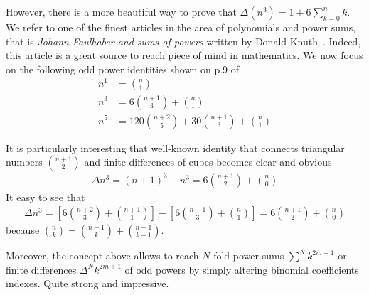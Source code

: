 However, there is a more beautiful way to prove that $\Delta(n^3) = 1 + 6 \sum_{k=0}^{n} k$.
We refer to one of the finest articles in the area of polynomials and power sums,
that is \textit{Johann Faulhaber and sums of powers} written by Donald Knuth~\cite{knuth1993johann}.
Indeed, this article is a great source to reach piece of mind in mathematics.
We now focus on the following odd power identities shown on p.9 of~\cite{knuth1993johann}
\begin{align*}
    n^1 &= \binom{n}{1} \\
    n^3 &= 6 \binom{n+1}{3} + \binom{n}{1} \\
    n^5 &= 120 \binom{n+2}{5} + 30 \binom{n+1}{3} + \binom{n}{1}
\end{align*}

It is particularly interesting that well-known identity that connects triangular numbers $\binom{n+1}{2}$
and finite differences of cubes becomes clear and obvious
\begin{align*}
    \Delta n^3 = (n+1)^3 - n^3
    =  6 \binom{n+1}{2} + \binom{n}{0}
\end{align*}
It easy to see that
\begin{align*}
    \Delta n^3
    = \left[ 6 \binom{n+2}{3} + \binom{n+1}{1} \right] - \left[ 6 \binom{n+1}{3} + \binom{n}{1} \right]
    = 6 \binom{n+1}{2} + \binom{n}{0}
\end{align*}
because $\binom{n}{k} = \binom{n-1}{k} + \binom{n-1}{k-1}$.

Moreover, the concept above allows to reach $N$-fold power sums $\sum^N k^{2m+1}$
or finite differences $\Delta^N k^{2m+1}$ of odd powers by simply altering
binomial coefficients indexes.
Quite strong and impressive.

